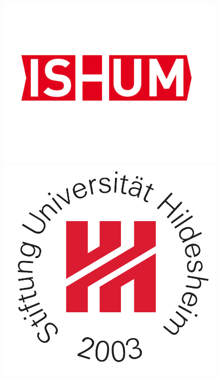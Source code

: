 \begin{titlepage}
\begin{figure}
	\centering
    \begin{minipage}{0.28\textwidth}
        \begin{flushleft}
            \includegraphics[scale=0.23]{csm_ISUM_Logo_Final_107dd2fa79.jpg}
        \end{flushleft}
    \end{minipage}
    \begin{minipage}{0.35\textwidth}
        \centering
        \hspace{0.25cm}
    \end{minipage}
    \begin{minipage}{0.25\textwidth}
        \begin{flushright}
            \includegraphics[scale=0.25]{St_Uni-Logo-9-2003-eps-converted-to.pdf}

\end{flushright}
\end{minipage}
\end{figure}
\end{titlepage}
